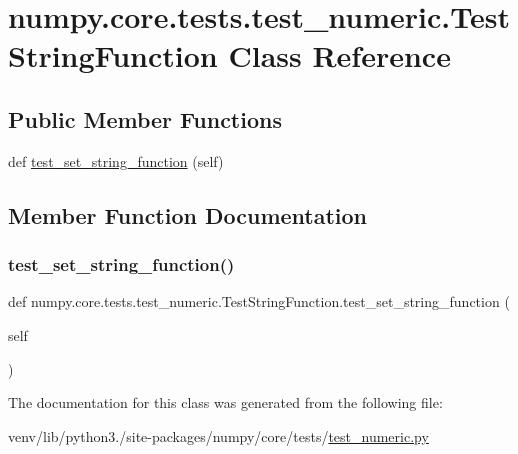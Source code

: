 \hypertarget{classnumpy_1_1core_1_1tests_1_1test__numeric_1_1TestStringFunction}{}\section{numpy.\+core.\+tests.\+test\+\_\+numeric.\+Test\+String\+Function Class Reference}
\label{classnumpy_1_1core_1_1tests_1_1test__numeric_1_1TestStringFunction}
\subsection*{Public Member Functions}
\begin{DoxyCompactItemize}
\item 
def \hyperlink{classnumpy_1_1core_1_1tests_1_1test__numeric_1_1TestStringFunction_a0e5581c29b0f15f2ec9575daac0b4ad9}{test\+\_\+set\+\_\+string\+\_\+function} (self)
\end{DoxyCompactItemize}


\subsection{Member Function Documentation}
\mbox{\label{classnumpy_1_1core_1_1tests_1_1test__numeric_1_1TestStringFunction_a0e5581c29b0f15f2ec9575daac0b4ad9}} 
\subsubsection{\texorpdfstring{test\+\_\+set\+\_\+string\+\_\+function()}{test\_set\_string\_function()}}
{\footnotesize\ttfamily def numpy.\+core.\+tests.\+test\+\_\+numeric.\+Test\+String\+Function.\+test\+\_\+set\+\_\+string\+\_\+function (\begin{DoxyParamCaption}\item[{}]{self }\end{DoxyParamCaption})}



The documentation for this class was generated from the following file\+:\begin{DoxyCompactItemize}
\item 
venv/lib/python3./site-\/packages/numpy/core/tests/\hyperlink{core_2tests_2test__numeric_8py}{test\+\_\+numeric.\+py}\end{DoxyCompactItemize}
